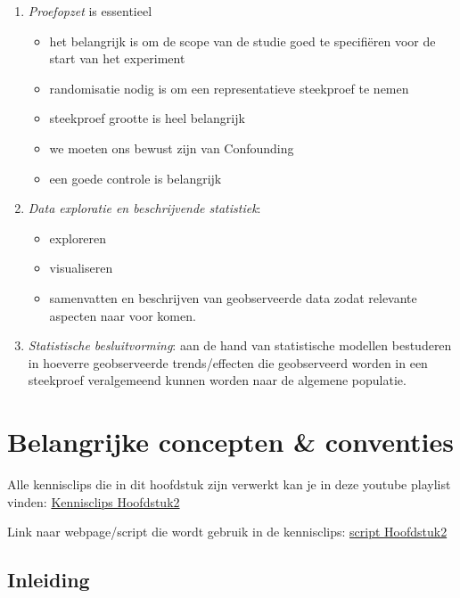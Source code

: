 \documentclass[
  12pt,dutch,coursenotes]{book}
\providecommand{\tightlist}{%
  \setlength{\itemsep}{0pt}\setlength{\parskip}{0pt}}
\theoremstyle{definition}
\theoremstyle{definition}
\theoremstyle{definition}
\theoremstyle{remark}
\begin{document}
\begin{enumerate}
\def\labelenumi{\arabic{enumi}.}
\item
  \emph{Proefopzet} is essentieel

  \begin{itemize}
  \item
    het belangrijk is om de scope van de studie goed te specifiëren voor de start van het experiment
  \item
    randomisatie nodig is om een representatieve steekproef te nemen
  \item
    steekproef grootte is heel belangrijk
  \item
    we moeten ons bewust zijn van Confounding
  \item
    een goede controle is belangrijk
  \end{itemize}
\item
  \emph{Data exploratie en beschrijvende statistiek}:

  \begin{itemize}
  \tightlist
  \item
    exploreren
  \item
    visualiseren
  \item
    samenvatten en beschrijven van geobserveerde data zodat relevante aspecten naar voor komen.
  \end{itemize}
\item
  \emph{Statistische besluitvorming}: aan de hand van statistische modellen bestuderen in hoeverre geobserveerde trends/effecten die geobserveerd worden in een steekproef veralgemeend kunnen worden naar de algemene populatie.
\end{enumerate}

\hypertarget{belangrijke-concepten-conventies}{%
\chapter{Belangrijke concepten \& conventies}\label{belangrijke-concepten-conventies}}

Alle kennisclips die in dit hoofdstuk zijn verwerkt kan je in deze youtube playlist vinden: \href{https://www.youtube.com/playlist?list=PLZH1hP8_LbJJ7apU5sAbRlUsve2nWz5ev}{Kennisclips Hoofdstuk2}

Link naar webpage/script die wordt gebruik in de kennisclips: \href{https://statomics.github.io/sbc20/rmd/02-concepts.html}{script Hoofdstuk2}

\hypertarget{inleiding-1}{%
\section{Inleiding}\label{inleiding-1}}
\end{document}
